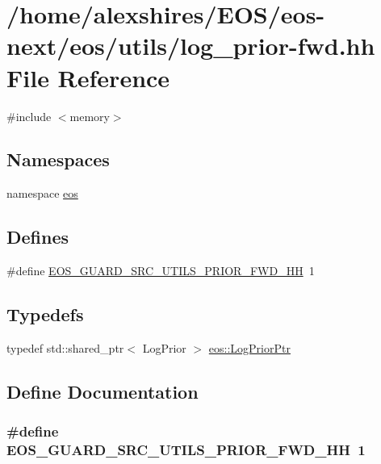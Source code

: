 \hypertarget{log__prior-fwd_8hh}{
\section{/home/alexshires/EOS/eos-\/next/eos/utils/log\_\-prior-\/fwd.hh File Reference}
\label{log__prior-fwd_8hh}
}
{\ttfamily \#include $<$memory$>$}\par
\subsection*{Namespaces}
\begin{DoxyCompactItemize}
\item 
namespace \hyperlink{namespaceeos}{eos}
\end{DoxyCompactItemize}
\subsection*{Defines}
\begin{DoxyCompactItemize}
\item 
\#define \hyperlink{log__prior-fwd_8hh_ac4831647c914184f821ad29b00a75754}{EOS\_\-GUARD\_\-SRC\_\-UTILS\_\-PRIOR\_\-FWD\_\-HH}~1
\end{DoxyCompactItemize}
\subsection*{Typedefs}
\begin{DoxyCompactItemize}
\item 
typedef std::shared\_\-ptr$<$ LogPrior $>$ \hyperlink{namespaceeos_ac5481e3b46ee55ff24606ee7f6e78651}{eos::LogPriorPtr}
\end{DoxyCompactItemize}


\subsection{Define Documentation}
\hypertarget{log__prior-fwd_8hh_ac4831647c914184f821ad29b00a75754}{
\subsubsection[{EOS\_\-GUARD\_\-SRC\_\-UTILS\_\-PRIOR\_\-FWD\_\-HH}]{\setlength{\rightskip}{0pt plus 5cm}\#define EOS\_\-GUARD\_\-SRC\_\-UTILS\_\-PRIOR\_\-FWD\_\-HH~1}}
\label{log__prior-fwd_8hh_ac4831647c914184f821ad29b00a75754}
